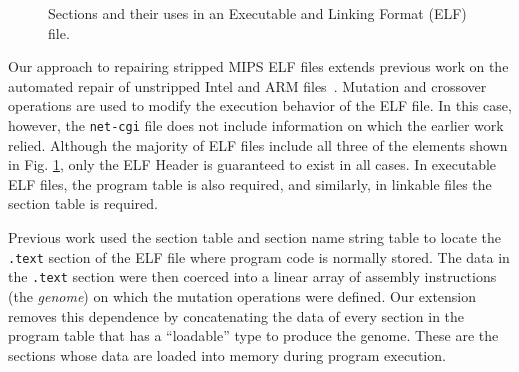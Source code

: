 \documentclass{sigcomm-alternate}
\begin{document}
{\begin{figure}[htb]
  \centering
\caption{\label{elf}Sections and their uses in an Executable and
  Linking Format (ELF) file.}
\end{figure}

Our approach to repairing stripped MIPS ELF files extends
previous work on the automated repair of unstripped Intel and ARM
files~\cite{schulte2013embedded}. 
Mutation and crossover operations are used to modify the
execution behavior of the ELF file.  In this case, however, the \texttt{net-cgi} file
does not include information on which
the earlier work relied.
 Although the majority of ELF files include all three of the elements
shown in Fig. \ref{elf}, only the ELF Header is guaranteed to exist in
all cases.  In executable ELF files, the program table is also required, and
similarly, in linkable files the section table is required.

Previous work used the section table and section name string table to
locate the \texttt{.text} section of the ELF file where program code
is normally stored.  The data in the \texttt{.text} section were then
coerced into a linear array of assembly instructions (the
\emph{genome}) on which the mutation operations were defined.  Our
extension removes this dependence by concatenating the data of every
section in the program table that has a ``loadable'' type to produce
the genome.  These are the sections whose data are loaded into memory
during program execution.

}
\end{document}
